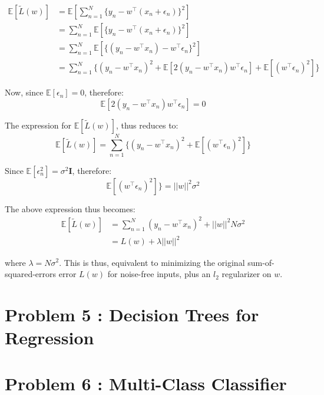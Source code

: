\documentclass{article}
\begin{document}
\begin{equation*}
\begin{aligned}
\mathds{E}[\tilde{L}(w)] &= \mathds{E}[\sum_{n=1}^N\{y_n-w^\top(x_n+\epsilon_n)\}^2] \\
&= \sum_{n=1}^N\mathds{E}[\{y_n-w^\top(x_n+\epsilon_n)\}^2] \\
&= \sum_{n=1}^N\mathds{E}[\{(y_n- w^\top x_n )-w^\top \epsilon_n\}^2] \\
&= \sum_{n=1}^N \{ (y_n- w^\top x_n )^2 +  \mathds{E}[2(y_n- w^\top x_n )w^\top \epsilon_n]+ \mathds{E}[(w^\top \epsilon_n)^2]\}
\end{aligned}
\end{equation*}

Now, since $\mathds{E}[\epsilon_n] = 0$, therefore:
$$\mathds{E}[2(y_n- w^\top x_n )w^\top \epsilon_n] = 0$$

The expression for $\mathds{E}[\tilde{L}(w)]$, thus reduces to:
$$\mathds{E}[\tilde{L}(w)] = \sum_{n=1}^N \{ (y_n- w^\top x_n )^2 +  \mathds{E}[(w^\top \epsilon_n)^2]\}$$

Since $\mathds{E}[\epsilon_n^2] = \sigma^2$\textbf{I}, therefore:
$$\mathds{E}[(w^\top \epsilon_n)^2]\} = ||w||^2\sigma^2$$

The above expression thus becomes:
\begin{equation*}
\begin{aligned}
\mathds{E}[\tilde{L}(w)] &= \sum_{n=1}^N (y_n- w^\top x_n )^2 + ||w||^2N\sigma^2\\
&= L(w) + \lambda||w||^2
\end{aligned}
\end{equation*}

where $\lambda = N\sigma^2$. This is thus, equivalent to minimizing the original sum-of-squared-errors error $L(w)$ for noise-free
inputs, plus an $l_2$ regularizer on $w$.

\section{Problem 5 : Decision Trees for Regression}
\section{Problem 6 : Multi-Class Classifier}
\end{document}

